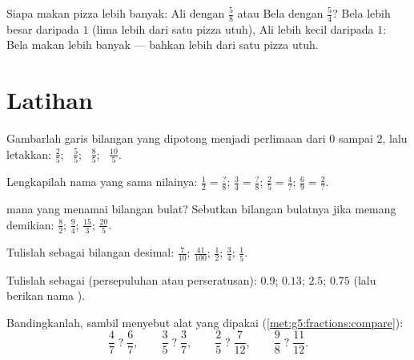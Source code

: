 \begin{example}\label{ex:g5:fractions:compare}
Siapa makan pizza lebih banyak: Ali dengan $\frac58$ atau Bela
dengan $\frac54$?  Bela lebih besar daripada $1$ (lima
 lebih dari satu pizza utuh),  Ali lebih kecil
daripada $1$: Bela makan lebih banyak --- bahkan lebih dari satu
pizza utuh.
\end{example}

\section{Latihan}

\begin{exercise}[$\star$]\label{exo:g5:fractions:1}
Gambarlah garis bilangan yang dipotong menjadi perlimaan dari $0$
sampai $2$, lalu letakkan: $\frac25$; \ $\frac55$; \ $\frac85$; \ $\frac{10}{5}$.
\end{exercise}

\begin{exercise}[$\star$]\label{exo:g5:fractions:2}
Lengkapilah nama yang sama nilainya:
$\frac12 = \frac{?}{8}$; \quad
$\frac34 = \frac{?}{8}$; \quad
$\frac{2}{5} = \frac{4}{?}$; \quad
$\frac{6}{9} = \frac{2}{?}$.
\end{exercise}

\begin{exercise}[$\star$]\label{exo:g5:fractions:3}
 mana yang menamai bilangan bulat? Sebutkan bilangan bulatnya
jika memang demikian: $\frac82$; \quad $\frac{9}{4}$; \quad
$\frac{15}{3}$; \quad $\frac{20}{5}$.
\end{exercise}

\begin{exercise}[$\star$]\label{exo:g5:fractions:4}
Tulislah sebagai bilangan desimal: $\frac{7}{10}$; \quad
$\frac{41}{100}$; \quad $\frac12$; \quad $\frac34$; \quad $\frac15$.
\end{exercise}

\begin{exercise}[$\star$]\label{exo:g5:fractions:5}
Tulislah sebagai  (persepuluhan atau perseratusan): $0.9$;
\quad $0.13$; \quad $2.5$; \quad $0.75$ (lalu berikan nama ).
\end{exercise}

\begin{exercise}[$\star$]\label{exo:g5:fractions:6}
Bandingkanlah, sambil menyebut alat yang dipakai
(\cref{met:g5:fractions:compare}):
\[
\frac47 \;?\; \frac67, \qquad
\frac35 \;?\; \frac37, \qquad
\frac25 \;?\; \frac{7}{12}, \qquad
\frac98 \;?\; \frac{11}{12} .
\]
\end{exercise}


